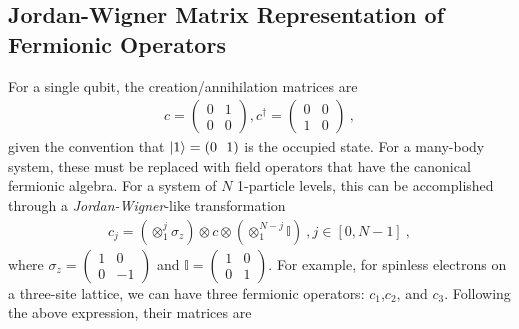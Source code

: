 \subsection*{Jordan-Wigner Matrix Representation of Fermionic Operators}
For a single qubit, the creation/annihilation matrices are
\begin{equation}\begin{aligned}
	c = \begin{pmatrix}0 & 1 \\ 0 & 0\end{pmatrix}, c^\dagger = \begin{pmatrix}0 & 0 \\ 1 & 0\end{pmatrix}~,
\end{aligned}\end{equation}
given the convention that \(\ket{1} = (0 ~ ~ 1)\) is the occupied state. For a many-body system, these must be replaced with field operators that have the canonical fermionic algebra. For a system of \(N\) 1-particle levels, this can be accomplished through a {\it Jordan-Wigner}-like transformation
\begin{equation}\begin{aligned}
	c_j = \left(\otimes_1^j \sigma_z\right) \otimes c \otimes \left(\otimes_1^{N-j} \mathbb{I}\right) ~, j \in [0, N-1]~,
\end{aligned}\end{equation}
where \(\sigma_z = \begin{pmatrix} 1 & 0 \\ 0 & -1 \end{pmatrix} \) and \(\mathbb{I} = \begin{pmatrix} 1 & 0 \\ 0 & 1 \end{pmatrix} \). For example, for spinless electrons on a three-site lattice, we can have three fermionic operators: \(c_{1}\),\(c_{2}\), and \(c_{3}\). Following the above expression, their matrices are\\
